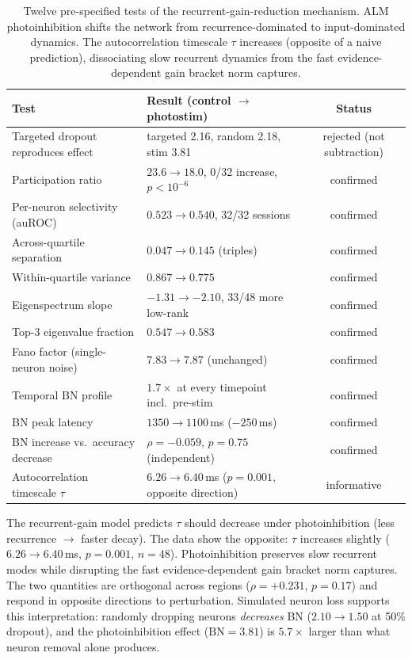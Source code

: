 \documentclass{article}
\begin{document}
\begin{table}[t]
\centering
\caption{Twelve pre-specified tests of the recurrent-gain-reduction mechanism. ALM photoinhibition shifts the network from recurrence-dominated to input-dominated dynamics. The autocorrelation timescale $\tau$ increases (opposite of a naive prediction), dissociating slow recurrent dynamics from the fast evidence-dependent gain bracket norm captures.}
\label{tab:mechanism}
\small
\begin{tabular}{llc}
\toprule
Test & Result (control $\to$ photostim) & Status \\
\midrule
Targeted dropout reproduces effect & targeted 2.16, random 2.18, stim 3.81 & rejected (not subtraction) \\
Participation ratio & $23.6 \to 18.0$, 0/32 increase, $p<10^{-6}$ & confirmed \\
Per-neuron selectivity (auROC) & $0.523 \to 0.540$, 32/32 sessions & confirmed \\
Across-quartile separation & $0.047 \to 0.145$ (triples) & confirmed \\
Within-quartile variance & $0.867 \to 0.775$ & confirmed \\
Eigenspectrum slope & $-1.31 \to -2.10$, 33/48 more low-rank & confirmed \\
Top-3 eigenvalue fraction & $0.547 \to 0.583$ & confirmed \\
Fano factor (single-neuron noise) & $7.83 \to 7.87$ (unchanged) & confirmed \\
Temporal BN profile & $1.7\times$ at every timepoint incl.\ pre-stim & confirmed \\
BN peak latency & $1350 \to 1100$\,ms ($-250$\,ms) & confirmed \\
BN increase vs.\ accuracy decrease & $\rho = -0.059$, $p = 0.75$ (independent) & confirmed \\
Autocorrelation timescale $\tau$ & $6.26 \to 6.40$\,ms ($p = 0.001$, opposite direction) & informative \\
\bottomrule
\end{tabular}
\end{table}

The recurrent-gain model predicts $\tau$ should decrease under photoinhibition (less recurrence $\to$ faster decay). The data show the opposite: $\tau$ increases slightly ($6.26 \to 6.40$\,ms, $p = 0.001$, $n = 48$). Photoinhibition preserves slow recurrent modes while disrupting the fast evidence-dependent gain bracket norm captures. The two quantities are orthogonal across regions ($\rho = +0.231$, $p = 0.17$) and respond in opposite directions to perturbation. Simulated neuron loss supports this interpretation: randomly dropping neurons \emph{decreases} BN ($2.10 \to 1.50$ at 50\% dropout), and the photoinhibition effect ($\text{BN} = 3.81$) is $5.7\times$ larger than what neuron removal alone produces.
\end{document}
